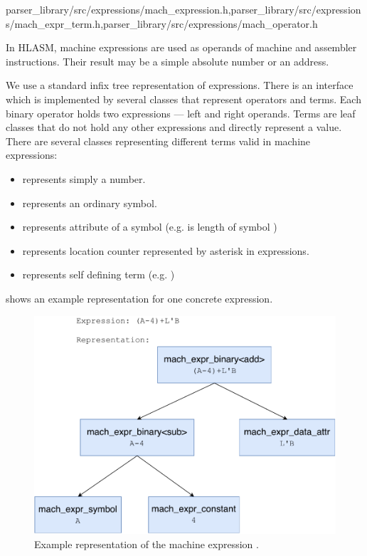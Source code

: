 {parser\_library/src/expressions/mach\_expression.h,parser\_library/src/expressions/mach\_expr\_term.h,parser\_library/src/expressions/mach\_operator.h}
\label{mach_expr}

In HLASM, machine expressions are used as operands of machine and assembler instructions. Their result may be a simple absolute number or an address.

We use a standard infix tree representation of expressions. There is an interface  which is implemented by several classes that represent operators and terms. Each binary operator holds two expressions --- left and right operands. Terms are leaf classes that do not hold any other expressions and directly represent a value. There are several classes representing different terms valid in machine expressions:
\begin{itemize}
	\item {} represents simply a number.
	\item {} represents an ordinary symbol.
	\item {} represents attribute of a symbol (e.g.  is length of symbol )
	\item {} represents location counter represented by asterisk in expressions. 
	\item {} represents self defining term (e.g. )
\end{itemize}
 shows an example representation for one concrete expression.

\begin{figure}
	\centering
	\includegraphics[width=13cm]{img/mach_expr_example}
	\caption{Example representation of the machine expression .}
	\label{mach_expr_example}
\end{figure}

